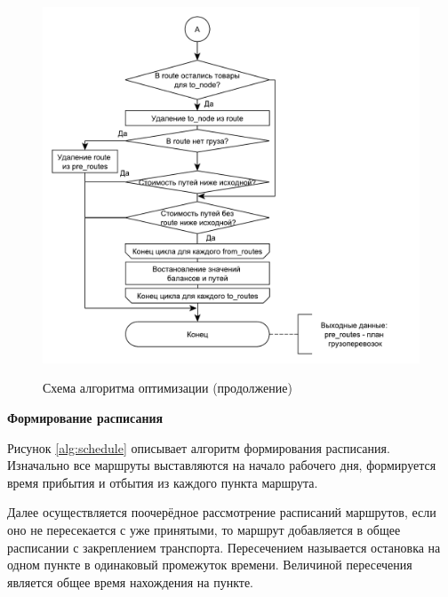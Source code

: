\begin{figure}[h]
	\begin{center}
		{\includegraphics[scale=0.7, angle=0, page=1]{img/potential_optimize_2.pdf}}
		\caption{Схема алгоритма оптимизации (продолжение)}
		\label{alg:potential_2}
	\end{center}
\end{figure}

\pagebreak
\textbf{Формирование расписания}

Рисунок \ref{alg:schedule} описывает алгоритм формирования расписания. Изначально все маршруты выставляются на начало рабочего дня, формируется время прибытия и отбытия из каждого пункта маршрута.

Далее осуществляется поочерёдное рассмотрение расписаний маршрутов, если оно не пересекается с уже принятыми, то маршрут добавляется в общее расписании с закреплением транспорта. Пересечением называется остановка на одном пункте в одинаковый промежуток времени. Величиной пересечения является общее время нахождения на пункте.

